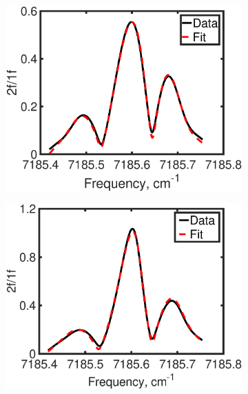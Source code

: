 \begin{figure} \centering 

\begin{subfigure}[b]{0.475\linewidth}  
\includegraphics[width=\textwidth]{fig/LOS_1392_fit.eps}  
\end{subfigure}%
\hfill
\begin{subfigure}[b]{0.475\linewidth}  
\centering  
\includegraphics[width=\textwidth]{fig/SE_1392_fit.eps}  
\end{subfigure} 


\end{figure}
